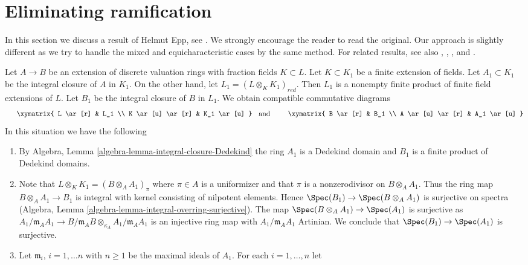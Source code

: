 \section{Eliminating ramification}
\label{section-eliminating-ramification}

\noindent
In this section we discuss a result of Helmut Epp, see \cite{Epp}. We strongly
encourage the reader to read the original. Our approach is slightly different
as we try to handle the mixed and equicharacteristic cases by the same method.
For related results, see also
\cite{Ponomarev}, \cite{Ponomarev-Abhyankar}, \cite{Kuhlmann}, and \cite{ZK}.

\begin{remark}
\label{remark-construction}
Let $A \to B$ be an extension of discrete valuation rings with fraction
fields $K \subset L$. Let $K \subset K_1$ be a finite extension of
fields. Let $A_1 \subset K_1$ be the integral closure of $A$ in $K_1$.
On the other hand, let $L_1 = (L \otimes_K K_1)_{red}$. Then $L_1$ is a
nonempty finite product of finite field extensions of $L$. Let $B_1$ be
the integral closure of $B$ in $L_1$. We obtain compatible commutative
diagrams
$$
\vcenter{
\xymatrix{
L \ar[r] & L_1 \\
K \ar[u] \ar[r] & K_1 \ar[u]
}
}
\quad\text{and}\quad
\vcenter{
\xymatrix{
B \ar[r] & B_1 \\
A \ar[u] \ar[r] & A_1 \ar[u]
}
}
$$
In this situation we have the following
\begin{enumerate}
\item By Algebra, Lemma \ref{algebra-lemma-integral-closure-Dedekind}
the ring $A_1$ is a Dedekind domain and $B_1$ is a finite product of
Dedekind domains.
\item Note that $L \otimes_K K_1 = (B \otimes_A A_1)_\pi$ where $\pi \in A$
is a uniformizer and that $\pi$ is a nonzerodivisor on $B \otimes_A A_1$. 
Thus the ring map $B \otimes_A A_1 \to B_1$ is integral with kernel
consisting of nilpotent elements. Hence $\Spec(B_1) \to \Spec(B \otimes_A A_1)$
is surjective on spectra
(Algebra, Lemma \ref{algebra-lemma-integral-overring-surjective}).
The map $\Spec(B \otimes_A A_1) \to \Spec(A_1)$ is surjective as
$A_1/\mathfrak m_A A_1 \to
B/\mathfrak m_AB \otimes_{\kappa_A} A_1/\mathfrak m_A A_1$
is an injective ring map with $A_1/\mathfrak m_A A_1$ Artinian.
We conclude that $\Spec(B_1) \to \Spec(A_1)$ is surjective.
\item Let $\mathfrak m_i$, $i = 1, \ldots n$ with $n \geq 1$ be the
maximal ideals of $A_1$. For each $i = 1, \ldots, n$ let

\end{enumerate}
\end{remark}
